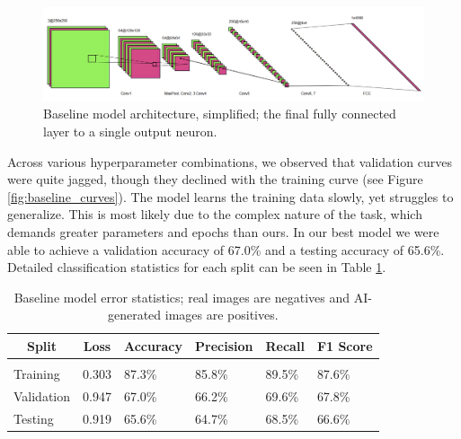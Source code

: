 \documentclass{article} %
\begin{document}
\begin{figure}[h]
    \begin{center}
        \includegraphics[scale=0.45]{figs/baseline.png}
    \end{center}
    \caption{Baseline model architecture, simplified; the final fully connected layer to a single output neuron.}
    \label{fig:baseline_arch}
\end{figure}

Across various hyperparameter combinations, we observed that validation curves were quite jagged, though they declined with the training curve (see Figure \ref{fig:baseline_curves}). The model learns the training data slowly, yet struggles to generalize. This is most likely due to the complex nature of the task, which demands greater parameters and epochs than ours. In our best model we were able to achieve a validation accuracy of 67.0\% and a testing accuracy of 65.6\%. Detailed classification statistics for each split can be seen in Table \ref{baseline_stats}.

\begin{table}[t]
    \caption{Baseline model error statistics; real images are negatives and AI-generated images are positives.}
    \label{baseline_stats}
    \begin{center}
        \begin{tabular}{llllll}
            \multicolumn{1}{c}{\bf Split} & \multicolumn{1}{c}{\bf Loss} & \multicolumn{1}{c}{\bf Accuracy} & \multicolumn{1}{c}{\bf Precision} & \multicolumn{1}{c}{\bf Recall} & \multicolumn{1}{c}{\bf F1 Score}
            \\ \hline \\
            Training                      & 0.303                        & 87.3\%                           & 85.8\%                            & 89.5\%                         & 87.6\%                           \\
            Validation                    & 0.947                        & 67.0\%                           & 66.2\%                            & 69.6\%                         & 67.8\%                           \\
            Testing                       & 0.919                        & 65.6\%                           & 64.7\%                            & 68.5\%                         & 66.6\%                           \\
        \end{tabular}
    \end{center}
\end{table}
\end{document}
